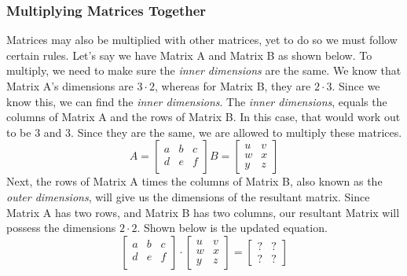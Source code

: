 \documentclass[final,1p,12pt]{elsarticle}
\begin{document}
        \subsubsection{Multiplying Matrices Together}
        Matrices may also be multiplied with other matrices, yet to do so we must follow certain rules. Let's say we have Matrix A and Matrix B as shown below. To multiply, we need to make sure the \emph{inner dimensions} are the same. We know that Matrix A's dimensions are $3 \cdot 2$, whereas for Matrix B, they are $2 \cdot 3$. Since we know this, we can find the \emph{inner dimensions}. The \emph{inner dimensions}, equals the columns of Matrix A and the rows of Matrix B. In this case, that would work out to be $3$ and $3$. Since they are the same, we are allowed to multiply these matrices. 
        \begin{equation*}%
            A =
            \begin{bmatrix}
                a & b & c\\
                d & e & f\\
            \end{bmatrix}
            B = 
            \begin{bmatrix}
                u & v\\
                w & x\\
                y & z
            \end{bmatrix}
        \end{equation*}
        Next, the rows of Matrix A times the columns of Matrix B, also known as the \emph{outer dimensions}, will give us the dimensions of the resultant matrix. Since Matrix A has two rows, and Matrix B has two columns, our resultant Matrix will possess the dimensions $2\cdot2$. Shown below is the updated equation. 
        \begin{equation*}
            \begin{bmatrix}
                a & b & c\\
                d & e & f\\
            \end{bmatrix}
        \cdot
            \begin{bmatrix}
                u & v\\
                w & x\\
                y & z
            \end{bmatrix}
        =
            \begin{bmatrix}
                ?&?\\
                ?&?
            \end{bmatrix}
        \end{equation*}
\end{document}
